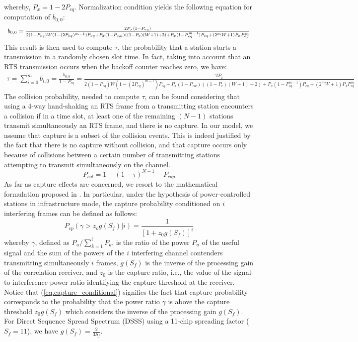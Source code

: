 \documentclass[10pt,onecolumn,a4paper]{IEEEtran}
\begin{document}
whereby, $P_x=1-2P_{eq}$.
Normalization condition yields the following equation for
computation of $b_{0,0}$:
\begin{equation}\small
\begin{array}{ll}
b_{0,0}=\frac{2P_x(1-P_{eq})}{2(1-P_{eq})W(1-(2P_{eq})^{m-1})P_{eq}+
P_x(1-P_{col})\left((1-P_{e})(W+1)+2\right)+
P_x(1-P_{eq}^{m-1})P_{eq}+(2^mW+1)P_xP_{eq}^{m}}
\end{array}
\end{equation}
This result is then used to compute $\tau$, the probability that a
station starts a transmission in a randomly chosen slot time. In
fact, taking into account that an RTS transmission occurs when the
backoff counter reaches zero, we have:
\begin{equation}\label{eq.tau}
\begin{array}{ll}
\tau=\sum_{i=0}^m
b_{i,0}=\frac{b_{0,0}}{1-P_{eq}}=\frac{2P_x}{2(1-P_{eq})W(1-(2P_{eq})^{m-1})P_{eq}+
P_x(1-P_{col})\left((1-P_{e})(W+1)+2\right)+
P_x(1-P_{eq}^{m-1})P_{eq}+(2^mW+1)P_xP_{eq}^{m}}
\end{array}
\end{equation}
The collision probability, needed to compute $\tau$, can be found
considering that using a 4-way hand-shaking an RTS frame from a
transmitting station encounters a collision if in a time slot, at
least one of the remaining $(N-1)$ stations transmit
simultaneously an RTS frame, and there is no capture. In our
model, we assume that capture is a subset of the collision events.
This is indeed justified by the fact that there is no capture
without collision, and that capture occurs only because of
collisions between a certain number of transmitting stations
attempting to transmit simultaneously on the channel.
\begin{equation}\label{eq.col}
P_{col} = 1-(1-\tau)^{N-1}-P_{cap}
\end{equation}
As far as capture effects are concerned, we resort to the
mathematical formulation proposed in \cite{zorzi_rao,Spasenovski}.
In particular, under the hypothesis of power-controlled stations
in infrastructure mode, the capture probability conditioned on $i$
interfering frames can be defined as follows:
\begin{equation}\label{eq.capture_conditional}
P_{cp}\left(\gamma>z_o
g(S_f)|i\right)=\frac{1}{{\left[1+z_{0}g(S_{f})\right]}^{i}}
\end{equation}
whereby $\gamma$, defined as $P_u/\sum_{k=1}^{i}P_k$, is the ratio
of the power $P_u$ of the useful signal and the sum of the
powers of the $i$ interfering channel contenders transmitting
simultaneously $i$ frames, $g(S_f)$ is the inverse of the processing gain of the
correlation receiver, and $z_0$ is the capture ratio, i.e., the
value of the signal-to-interference power ratio identifying the
capture threshold at the receiver. Notice that
(\ref{eq.capture_conditional}) signifies the fact that capture
probability corresponds to the probability that the power ratio
$\gamma$ is above the capture threshold $z_{0}g(S_{f})$ which
considers the inverse of the processing gain $g(S_{f})$. For Direct Sequence
Spread Spectrum (DSSS) using a 11-chip spreading factor
($S_f=11$), we have $g(S_{f})=\frac{2}{3S_f}$.
\end{document}
